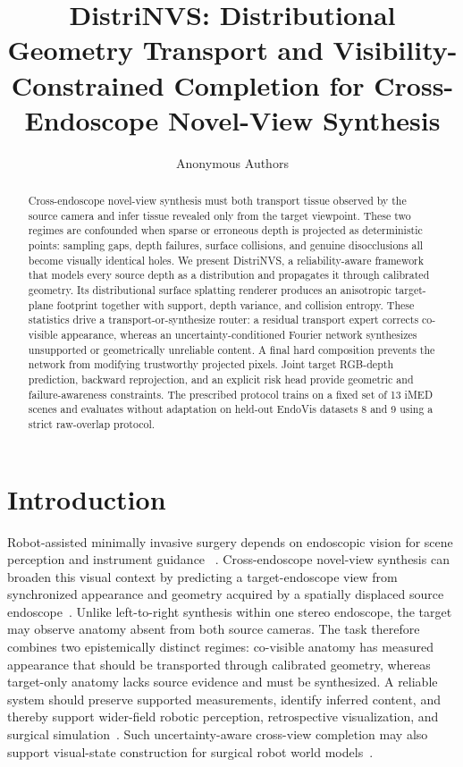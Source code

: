 \documentclass[letterpaper,10pt,conference]{ieeeconf}
\title{\LARGE \bf
DistriNVS: Distributional Geometry Transport and Visibility-Constrained Completion for Cross-Endoscope Novel-View Synthesis}
\author{Anonymous Authors}
\newcommand{\todo}[1]{\textcolor{todoRed}{\textbf{[TODO: #1]}}}
\begin{document}
\maketitle
\thispagestyle{empty}
\pagestyle{empty}

\begin{abstract}
Cross-endoscope novel-view synthesis must both transport tissue observed by
the source camera and infer tissue revealed only from the target viewpoint.
These two regimes are confounded when sparse or erroneous depth is projected
as deterministic points: sampling gaps, depth failures, surface collisions,
and genuine disocclusions all become visually identical holes. We present
DistriNVS, a reliability-aware framework that models every source depth as a
distribution and propagates it through calibrated geometry. Its
distributional surface splatting renderer produces an anisotropic target-plane
footprint together with support, depth variance, and collision entropy. These
statistics drive a transport-or-synthesize router: a residual transport expert
corrects co-visible appearance, whereas an uncertainty-conditioned Fourier
network synthesizes unsupported or geometrically unreliable content. A final hard composition prevents the
network from modifying trustworthy projected pixels. Joint target RGB-depth
prediction, backward reprojection, and an explicit risk head provide geometric
and failure-awareness constraints. The prescribed protocol trains on a fixed
set of 13 iMED scenes and evaluates without adaptation on held-out EndoVis
datasets 8 and 9 using a strict raw-overlap protocol. 
\end{abstract}

\section{Introduction}
\label{sec:introduction}

Robot-assisted minimally invasive surgery depends on endoscopic vision for
scene perception and instrument guidance
~\cite{wei2026roboticperception,sunmola2026surgicalgaussiansurfels}.
Cross-endoscope novel-view synthesis can broaden this visual context by
predicting a target-endoscope view from synchronized appearance and geometry
acquired by a spatially displaced source endoscope~\cite{wang2026endoe2egs}.
Unlike left-to-right synthesis within one stereo endoscope, the target may
observe anatomy absent from both source cameras. The task therefore combines
two epistemically distinct regimes: co-visible anatomy has measured appearance
that should be transported through calibrated geometry, whereas target-only
anatomy lacks source evidence and must be synthesized. A reliable system should
preserve supported measurements, identify inferred content, and thereby support
wider-field robotic perception, retrospective visualization, and surgical
simulation~\cite{hsieh2026extrags}.
Such uncertainty-aware cross-view completion may also support visual-state
construction for surgical robot world models~\cite{he2025surgworld}.
\end{document}

